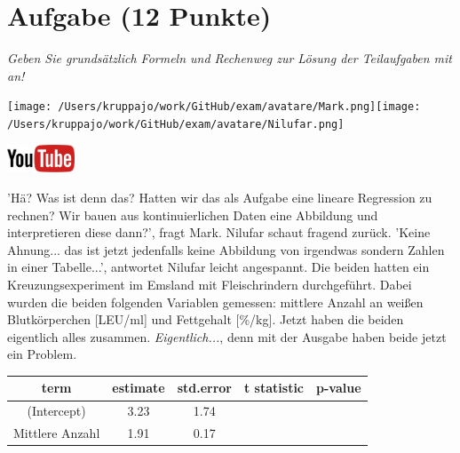 \documentclass[a4paper, 9pt]{scrartcl}\usepackage[]{graphicx}\usepackage[]{xcolor}
\begin{document}
\section{Aufgabe \hfill (12 Punkte)}

\textit{Geben Sie grundsätzlich Formeln und Rechenweg zur Lösung der Teilaufgaben mit an!} \\[1Ex]
 

 
\begin{minipage}[t]{0.5\textwidth}
\texttt{[image: /Users/kruppajo/work/GitHub/exam/avatare/Mark.png]}\hspace{-4mm}\texttt{[image: /Users/kruppajo/work/GitHub/exam/avatare/Nilufar.png]}
\end{minipage}
\begin{minipage}[t]{0.5\textwidth}
\hfill
\href{https://youtu.be/lJp8rFmMnrs}{\includegraphics[width = 2cm]{img/youtube}}
\end{minipage}
\vspace{1ex}



'Hä? Was ist denn das? Hatten wir das als Aufgabe eine lineare Regression zu rechnen? Wir bauen aus kontinuierlichen Daten eine Abbildung und interpretieren diese dann?', fragt Mark. Nilufar schaut fragend zurück. 'Keine Ahnung... das ist jetzt jedenfalls keine Abbildung von irgendwas sondern Zahlen in einer Tabelle...', antwortet Nilufar leicht angespannt. Die beiden hatten ein Kreuzungsexperiment im Emsland mit Fleischrindern durchgeführt. Dabei wurden die beiden folgenden Variablen gemessen: mittlere Anzahl an weißen Blutkörperchen [LEU/ml] und Fettgehalt [\%/kg]. Jetzt haben die beiden eigentlich alles zusammen. \textit{Eigentlich...}, denn mit der \Rlogo Ausgabe haben beide jetzt ein Problem.

\begin{table}[!h]
\centering\begingroup\fontsize{12}{14}\selectfont

\begin{tabular}{ccccc}
\toprule
term & estimate & std.error & t statistic & p-value\\
\midrule
(Intercept) & 3.23 & 1.74 &  & \\
Mittlere Anzahl & 1.91 & 0.17 &  & \\
\bottomrule
\end{tabular}
\endgroup{}
\end{table}
\end{document}

